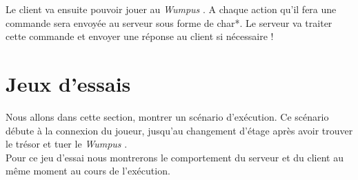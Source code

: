 \documentclass[a4paper,10pt]{article}
\newcommand{\gameName}{\emph{Wumpus }}
\begin{document}
	Le client va ensuite pouvoir jouer au \gameName. A chaque action qu'il fera une commande sera envoyée au serveur sous forme de char*. Le serveur va traiter
	cette commande et envoyer une réponse au client si nécessaire !





	\newpage
	\section{Jeux d'essais}
	
		Nous allons dans cette section, montrer un scénario d'exécution. Ce scénario débute à la connexion du joueur, jusqu'au changement d'étage après avoir
trouver le trésor et tuer le \gameName.\\

Pour ce jeu d'essai nous montrerons le comportement du serveur et du client au même moment au cours de l'exécution.
\end{document}
